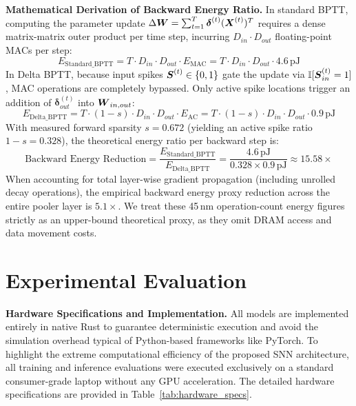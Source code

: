 \documentclass[10pt]{article} %
\begin{document}
\textbf{Mathematical Derivation of Backward Energy Ratio.} In standard BPTT, computing the parameter update $\Delta \boldsymbol{W} = \sum_{t=1}^T \boldsymbol{\delta}^{(t)} (\boldsymbol{X}^{(t)})^T$ requires a dense matrix-matrix outer product per time step, incurring $D_{in} \cdot D_{out}$ floating-point MACs per step:
\begin{equation}
E_{\text{Standard\_BPTT}} = T \cdot D_{in} \cdot D_{out} \cdot E_{\text{MAC}} = T \cdot D_{in} \cdot D_{out} \cdot 4.6\,\text{pJ}
\end{equation}
In Delta BPTT, because input spikes $\boldsymbol{S}^{(t)} \in \{0, 1\}$ gate the update via $\mathbb{I}[\boldsymbol{S}_{in}^{(t)}=1]$, MAC operations are completely bypassed. Only active spike locations trigger an addition of $\bm{\delta}_{out}^{(t)}$ into $\boldsymbol{W}_{in, out}$:
\begin{equation}
E_{\text{Delta\_BPTT}} = T \cdot (1-s) \cdot D_{in} \cdot D_{out} \cdot E_{\text{AC}} = T \cdot (1-s) \cdot D_{in} \cdot D_{out} \cdot 0.9\,\text{pJ}
\end{equation}
With measured forward sparsity $s = 0.672$ (yielding an active spike ratio $1-s = 0.328$), the theoretical energy ratio per backward step is:
\begin{equation}
\text{Backward Energy Reduction} = \frac{E_{\text{Standard\_BPTT}}}{E_{\text{Delta\_BPTT}}} = \frac{4.6\,\text{pJ}}{0.328 \times 0.9\,\text{pJ}} \approx 15.58\times
\end{equation}
When accounting for total layer-wise gradient propagation (including unrolled decay operations), the empirical backward energy proxy reduction across the entire pooler layer is $5.1\times$. We treat these 45\,nm operation-count energy figures strictly as an upper-bound theoretical proxy, as they omit DRAM access and data movement costs.


\section{Experimental Evaluation}

\textbf{Hardware Specifications and Implementation.} All models are implemented entirely in native Rust to guarantee deterministic execution and avoid the simulation overhead typical of Python-based frameworks like PyTorch. To highlight the extreme computational efficiency of the proposed SNN architecture, all training and inference evaluations were executed exclusively on a standard consumer-grade laptop without any GPU acceleration. The detailed hardware specifications are provided in Table~\ref{tab:hardware_specs}.
\end{document}
